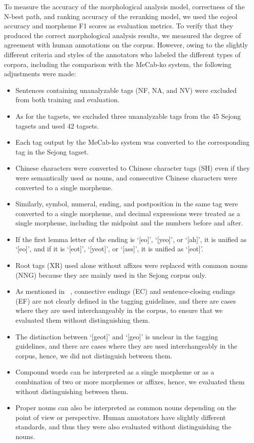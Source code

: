 \documentclass[AMS,STIX2COL]{WileyNJD-v2}
\begin{document}
    To measure the accuracy of the morphological analysis model, correctness of the N-best path, and ranking accuracy of the reranking model, we used the eojeol accuracy and morpheme F1 scores as evaluation metrics.
    To verify that they produced the correct morphological analysis results, we measured the degree of agreement with human annotations on the corpus.
    However, owing to the slightly different criteria and styles of the annotators who labeled the different types of corpora, including the comparison with the MeCab-ko system, the following adjustments were made:
    \begin{itemize}
        \item Sentences containing unanalyzable tags (NF, NA, and NV) were excluded from both training and evaluation.
        \item As for the tagsets, we excluded three unanalyzable tags from the 45 Sejong tagsets and used 42 tagsets.
        \item Each tag output by the MeCab-ko system was converted to the corresponding tag in the Sejong tagset.
        \item Chinese characters were converted to Chinese character tags (SH) even if they were semantically used as nouns, and consecutive Chinese characters were converted to a single morpheme.
        \item Similarly, symbol, numeral, ending, and postposition in the same tag were converted to a single morpheme, and decimal expressions were treated as a single morpheme, including the midpoint and the numbers before and after.
        \item If the first lemma letter of the ending is `[eo]', `[yeo]', or `[ah]', it is unified as `[eo]', and if it is `[eot]', `[yeot]', or `[ass]', it is unified as `[eot]'. %
        \item Root tags (XR) used alone without affixes were replaced with common nouns (NNG) because they are mainly used in the Sejong corpus only.
        \item As mentioned in ~\cite{KimIH2010}, connective endings (EC) and sentence-closing endings (EF) are not clearly defined in the tagging guidelines, and there are cases where they are used interchangeably in the corpus, to ensure that we evaluated them without distinguishing them.
        \item The distinction between `[geot]' and `[geo]' is unclear in the tagging guidelines, and there are cases where they are used interchangeably in the corpus, hence, we did not distinguish between them. %
        \item Compound words can be interpreted as a single morpheme or as a combination of two or more morphemes or affixes, hence, we evaluated them without distinguishing between them.
        \item Proper nouns can also be interpreted as common nouns depending on the point of view or perspective. Human annotators have slightly different standards, and thus they were also evaluated without distinguishing the nouns.
    \end{itemize}
\end{document}
